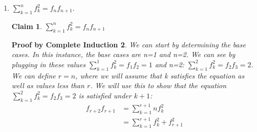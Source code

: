 \documentclass[10pt]{letter}
\newtheorem{PBCI}{Proof by Complete Induction}
\newtheorem{claim}{Claim}
\theoremstyle{definition}
\begin{document}
\begin{description}
\begin{enumerate}
\begin{PBCI}
We must first prove the base case, which is d=1. Plugging in for one, we get $2^1-1$, or 1 move, which is correct, as you only need to move the one piece.We must now find a way to represent the number of moves, $h$, that can be taken given $d-1$ disks, or $h_{d-1}$. It is noted that in order to move the bottom piece, all pieces above it must be shifted to another rod. This causes us to move $h_{d-1}$ disks, move the bottom disk, which adds an additional move, and finally move the rod with $d-1$ disks onto the bottom disk. This yet again takes $h_{d-1}$ moves, therefore the total moves which can be taken for $d$ disks is $h_d=2h_{d-1}+1$ (Formula 2). We can now show that $2h_d+1=2^d-1$(Equation 1).  We can define $k$ as $k=d$ and show that the claim is true for k+1: \\
\begin{align*}
2^{k+1}-1&=2^{k+1}-1 \\
&=2*2^k-1 \\
&= 2*(2^{h_k}+2)+1 \tag{Replaced using formuala 1} \\
&=4h_k+3 \\
&=2(2h_k)+3 \\
&=2h_{k+1}+1 \tag{Replaced d with k+1 in formula 2 through complete induction and solved for h with k disks} \\  
\end{align*}
Therefore, since this is true for all $k+1$, through mathematical induction we can show that given a Tower of Hanoi with $d$ disks, it can be solved in $2^d-1$ moves. $\qed$
\end{PBCI}
		\item  $\displaystyle\sum_{k=1}^nf_k^2=f_nf_{n+1}$.
\begin{claim}
$\displaystyle\sum_{k=1}^nf_k^2=f_nf_{n+1}$
\end{claim}
\begin{PBCI}
We can start by determining the base cases. In this instance, the base cases are n=1 and n=2. We can see by plugging in these values $\displaystyle\sum_{k=1}^1f_k^2=f_1f_{2}=1$ and n=2: $\displaystyle\sum_{k=1}^2f_k^2=f_2f_{3}=2$. We can define $r=n$, where we will assume that k satisfies the equation as well as values less than $r$. We will use this to show that the equation $\displaystyle\sum_{k=1}^2f_k^2=f_2f_{3}=2$ is satisfied under $k+1$:
\begin{align*}
f_{r+2}f_{r+1}&=\displaystyle\sum_{k=1}^{r+1}nf_k^2 \\
&=\displaystyle\sum_{k=1}^{r+1}f_k^2+f^2_{r+1} \\

\end{align*}
\end{PBCI}
\end{enumerate}
\end{description}
\end{document}
